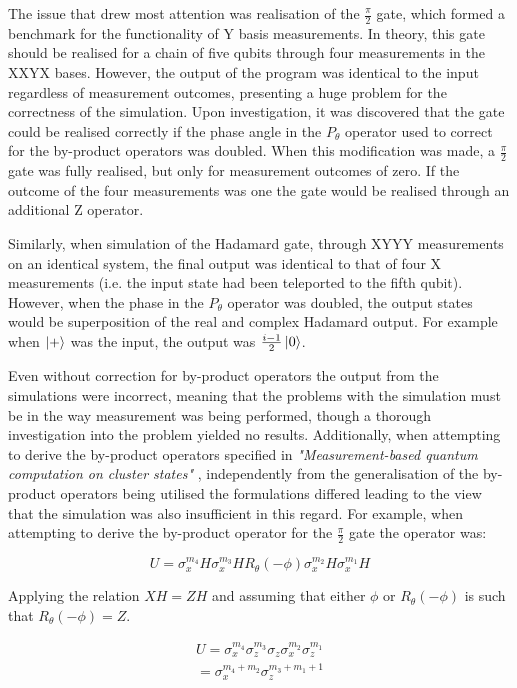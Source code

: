 The issue that drew most attention was realisation of the $\frac{\pi}{2}$ gate, which formed a benchmark for the functionality of Y basis measurements. In theory, this gate should be realised for a chain of five qubits through four measurements in the XXYX bases. However, the output of the program was identical to the input regardless of measurement outcomes, presenting a huge problem for the correctness of the simulation. Upon investigation, it was discovered that the gate could be realised correctly if the phase angle in the $P_{\theta}$ operator used to correct for the by-product operators was doubled. When this modification was made, a $\frac{\pi}{2}$ gate was fully realised, but only for measurement outcomes of zero. If the outcome of the four measurements was one the gate would be realised through an additional Z operator.

Similarly, when simulation of the Hadamard gate, through XYYY measurements on an identical system, the final output was identical to that of four X measurements (i.e. the input state had been teleported to the fifth qubit). However, when the phase in the $P_{\theta}$ operator was doubled, the output states would be superposition of the real and complex Hadamard output. For example when $\ket{+}$ was the input, the output was $\frac{i - 1}{2} \ket{0}$. 

Even without correction for by-product operators the output from the simulations were incorrect, meaning that the problems with the simulation must be in the way measurement was being performed, though a thorough investigation into the problem yielded no results. Additionally, when attempting to derive the by-product operators specified in \textit{"Measurement-based quantum computation on cluster states"} \citep{raussendorf_measurement-based_2003}, independently from the generalisation of the by-product operators being utilised the formulations differed leading to the view that the simulation was also insufficient in this regard. For example, when attempting to derive the by-product operator for the $\frac{\pi}{2}$ gate the operator was:

\begin{equation}
U = \sigma_{x}^{m_{4}} H \sigma_{x}^{m_{3}} H R_{\theta}(- \phi) \sigma_{x}^{m_{2}} H \sigma_{x}^{m_{1}} H
\end{equation}

Applying the relation $XH = ZH$ and assuming that either $\phi$ or $R_{\theta}(- \phi)$ is such that $R_{\theta}(- \phi) = Z$.

\begin{multline}
U = \sigma_{x}^{m_{4}} \sigma_{z}^{m_{3}} \sigma_{z} \sigma_{x}^{m_{2}} \sigma_{z}^{m_{1}} \\
= \sigma_{x}^{m_{4} + m_{2}} \sigma_{z}^{m_{3} + m_{1} + 1} \\
\end{multline}

